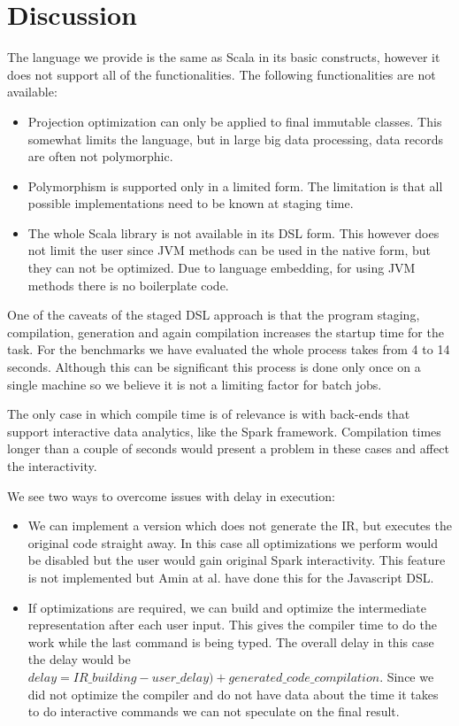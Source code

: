 \section{Discussion}
\label{sec:discussion}


The language we provide is the same as Scala in its basic constructs, however it does not support all of the functionalities. The following functionalities are not available:  
\begin{itemize}
\item Projection optimization can only be applied to final immutable classes. This somewhat limits the language, but in large big data processing, data records are often not polymorphic. 
\item Polymorphism is supported only in a limited form. The limitation is that all possible implementations need to be known at staging time.
\item The whole Scala library is not available in its DSL form. This however does not limit the user since JVM methods can be used in the native form, but they can not be optimized. Due to language embedding, for using JVM methods there is no boilerplate code. 
\end{itemize}



One of the caveats of the staged DSL approach is that the program staging, compilation, generation and again compilation increases the startup time for the task. For the benchmarks we have evaluated the whole process takes from 4 to 14 seconds. Although this can be significant this process is done only once on a single machine so we believe it is not a limiting factor for batch jobs.

The only case in which compile time is of relevance is with back-ends that support interactive data analytics, like the Spark framework. Compilation times longer than a couple of seconds would present a problem in these cases and affect the interactivity. 

We see two ways to overcome issues with delay in execution:
\begin{itemize}
\item We can implement a version which does not generate the IR, but executes the original code straight away. In this case all optimizations we perform would be disabled but the user would gain original Spark interactivity. This feature is not implemented but Amin at al.  have done this for the Javascript DSL.

\item If optimizations are required,  we can build and optimize the intermediate representation after each user input. This gives the compiler time to do the work while the last command is being typed. The overall delay in this case the delay would be $delay = IR\_building - user\_delay) + generated\_code\_compilation$. Since we did not optimize the compiler and do not have data about the time it takes to do interactive commands we can not speculate on the final result.
\end{itemize}

